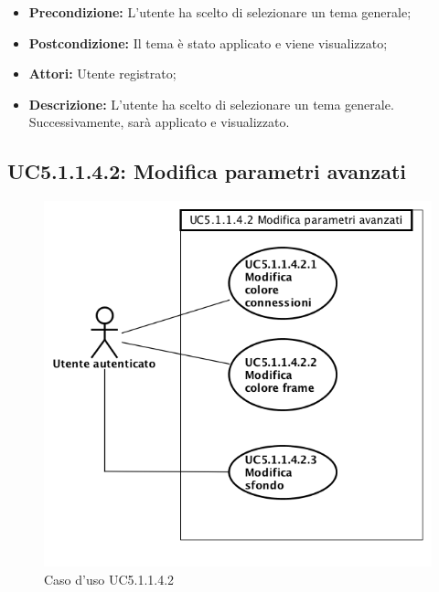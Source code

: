 \begin{itemize}
	\item \textbf{Precondizione:} L'utente ha scelto di selezionare un tema generale;
	\item \textbf{Postcondizione:} Il tema è stato applicato e viene visualizzato;
	\item \textbf{Attori:} Utente registrato;
	\item \textbf{Descrizione:} L'utente ha scelto di selezionare un tema generale. Successivamente, sarà applicato e visualizzato.
\end{itemize}
\subsection{ UC5.1.1.4.2: Modifica parametri avanzati}

\begin{figure}[h]
	\begin{center}
	\includegraphics[scale=0.6]{diagram/UC5-1-1-4-2.png}
	\caption{Caso d'uso UC5.1.1.4.2}
	\end{center}
\end{figure}
